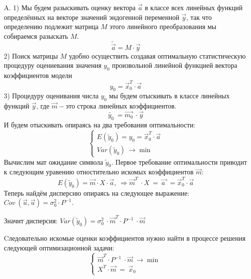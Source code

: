\documentclass[12pt,a4paper]{article}
\begin{document}
A. 1) Мы будем разыскивать оценку вектора $\displaystyle \vec{a}$ в классе всех линейных функций определённых на векторе значений эндогенной переменной $\displaystyle \vec{y}$, так что определению подлежит матрица $\displaystyle M$ этого линейного преобразования мы собираемся разыскать $\displaystyle M$.
\begin{equation*}
\widetilde{\vec{a}} =M\cdot \vec{y}
\end{equation*}
2) Поиск матрицы $\displaystyle M$ удобно осуществить создавая оптимальную статистическую процедуру оцениевания значения $\displaystyle y_{0}$ произвольной линейной функцией вектора коэффициентов модели
\begin{equation*}
y_{0} =\vec{x}^{T}_{0} \cdot \vec{a}
\end{equation*}
3) Процедуру оценивания числа $\displaystyle y_{0}$ мы будем отыскивать в классе линейных функций $\displaystyle \vec{y}$, где $\displaystyle \vec{m} -$это строка линейных коэффициентов.
\begin{equation*}
\widetilde{y_{0}} \ =\overrightarrow{m_{0}} \ \cdot \vec{y}
\end{equation*}
И будем отыскивать опираясь на два требования оптимальности:
\begin{equation*}
\begin{cases}
E\left(\tilde{y}_{0}\right) =y_{0} =\vec{x}^{T}_{0} \cdot \vec{a}\\
Var\left(\tilde{y}_{0}\right) \ \rightarrow \min
\end{cases}
\end{equation*}
Вычислим мат ожидание символа $\displaystyle \tilde{y}_{0}$. Первое требование оптимальности приводит к следующим уравению отностительно искомых коэффициентов $\displaystyle \vec{m}$:
\begin{equation*}
E\left(\tilde{y}_{0}\right) =\vec{m} \cdot X\cdot \vec{a} ,\ \Rightarrow \vec{m}^{T} \ \cdot X\ =\ \overrightarrow{a\ } \ =\vec{x}^{T}_{0} \cdot \vec{a}
\end{equation*}
Теперь найдём дисперсию опираясь на следующее выражение: $\displaystyle Cov\ \left(\vec{u} ,\vec{u}\right) =\sigma ^{2}_{0} \cdot P^{-1}$.

Значит дисперсия: $\displaystyle Var\left(\tilde{y}_{0}\right) =\sigma ^{2}_{0} \ \cdot \vec{m}^{T} \cdot P^{-1} \ \cdot \vec{m}$

Cледовательно искомые оценки коэффициентов нужно найти в процессе решения следующей оптимизационной задачи:
\begin{equation*}
\begin{cases}
\vec{m}^{T} \cdot P^{-1} \ \cdot \vec{m} \ \rightarrow \min\\
X^{T} \cdot \vec{m} \ =\ \vec{x}_{0}
\end{cases}
\end{equation*}
\end{document}
